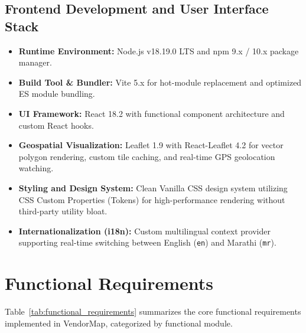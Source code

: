 \subsection{Frontend Development and User Interface Stack}
\begin{itemize}
    \item \textbf{Runtime Environment:} Node.js v18.19.0 LTS and npm 9.x / 10.x package manager.
    \item \textbf{Build Tool \& Bundler:} Vite 5.x for hot-module replacement and optimized ES module bundling.
    \item \textbf{UI Framework:} React 18.2 with functional component architecture and custom React hooks.
    \item \textbf{Geospatial Visualization:} Leaflet 1.9 with React-Leaflet 4.2 for vector polygon rendering, custom tile caching, and real-time GPS geolocation watching.
    \item \textbf{Styling and Design System:} Clean Vanilla CSS design system utilizing CSS Custom Properties (Tokens) for high-performance rendering without third-party utility bloat.
    \item \textbf{Internationalization (i18n):} Custom multilingual context provider supporting real-time switching between English (\texttt{en}) and Marathi (\texttt{mr}).
\end{itemize}

\section{Functional Requirements}
\label{sec:functional_requirements}

Table~\ref{tab:functional_requirements} summarizes the core functional requirements implemented in VendorMap, categorized by functional module.

